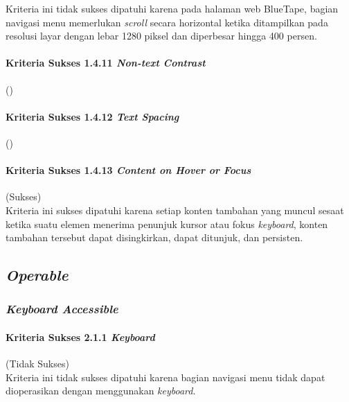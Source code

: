 Kriteria ini tidak sukses dipatuhi karena pada halaman web BlueTape, bagian navigasi menu memerlukan \textit{scroll} secara horizontal ketika ditampilkan pada resolusi layar dengan lebar 1280 piksel dan diperbesar hingga 400 persen.

\paragraph{Kriteria Sukses 1.4.11 \textit{Non-text Contrast}}
\label{par:kepatuhan_bluetape_kriteria_sukses_1.4.11}
()\\

\paragraph{Kriteria Sukses 1.4.12 \textit{Text Spacing}}
\label{par:kepatuhan_bluetape_kriteria_sukses_1.4.12}
()\\

\paragraph{Kriteria Sukses 1.4.13 \textit{Content on Hover or Focus}}
\label{par:kepatuhan_bluetape_kriteria_sukses_1.4.13}
(Sukses)\\

Kriteria ini sukses dipatuhi karena setiap konten tambahan yang muncul sesaat ketika suatu elemen menerima penunjuk kursor atau fokus \textit{keyboard}, konten tambahan tersebut dapat disingkirkan, dapat ditunjuk, dan persisten.

\subsection{\textit{Operable}}
\label{subsec:kepatuhan_bluetape_operable}

\subsubsection{\textit{Keyboard Accessible}}
\label{subsubsec:kepatuhan_bluetape_keyboard_accessible}

\paragraph{Kriteria Sukses 2.1.1 \textit{Keyboard}}
\label{par:kepatuhan_bluetape_kriteria_sukses_2.1.1}
(Tidak Sukses)\\

Kriteria ini tidak sukses dipatuhi karena bagian navigasi menu tidak dapat dioperasikan dengan menggunakan \textit{keyboard}.

